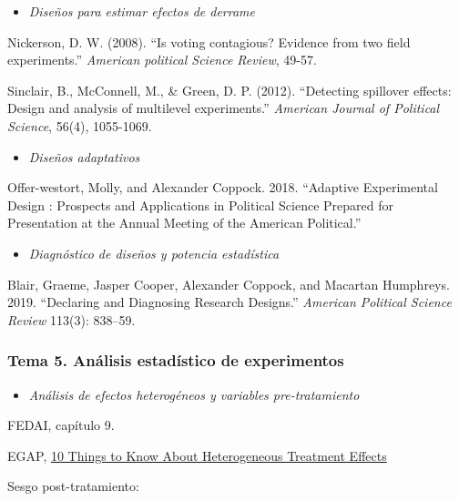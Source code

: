\documentclass[
  12pt,
]{article}
\providecommand{\tightlist}{%
  \setlength{\itemsep}{0pt}\setlength{\parskip}{0pt}}
\begin{document}
\begin{itemize}
\tightlist
\item
  \emph{Diseños para estimar efectos de derrame}
\end{itemize}

Nickerson, D. W. (2008). ``Is voting contagious? Evidence from two field
experiments.'' \emph{American political Science Review}, 49-57.

Sinclair, B., McConnell, M., \& Green, D. P. (2012). ``Detecting
spillover effects: Design and analysis of multilevel experiments.''
\emph{American Journal of Political Science}, 56(4), 1055-1069.

\begin{itemize}
\tightlist
\item
  \emph{Diseños adaptativos}
\end{itemize}

Offer-westort, Molly, and Alexander Coppock. 2018. ``Adaptive
Experimental Design : Prospects and Applications in Political Science
Prepared for Presentation at the Annual Meeting of the American
Political.''

\begin{itemize}
\tightlist
\item
  \emph{Diagnóstico de diseños y potencia estadística}
\end{itemize}

Blair, Graeme, Jasper Cooper, Alexander Coppock, and Macartan Humphreys.
2019. ``Declaring and Diagnosing Research Designs.'' \emph{American
Political Science Review} 113(3): 838--59.

\hypertarget{tema-5.-anuxe1lisis-estaduxedstico-de-experimentos}{%
\subsubsection{Tema 5. Análisis estadístico de
experimentos}\label{tema-5.-anuxe1lisis-estaduxedstico-de-experimentos}}

\begin{itemize}
\tightlist
\item
  \emph{Análisis de efectos heterogéneos y variables pre-tratamiento}
\end{itemize}

FEDAI, capítulo 9.

EGAP,
\href{https://egap.org/resource/10-things-to-know-about-heterogeneous-treatment-effects/}{10
Things to Know About Heterogeneous Treatment Effects}

Sesgo post-tratamiento:
\end{document}
